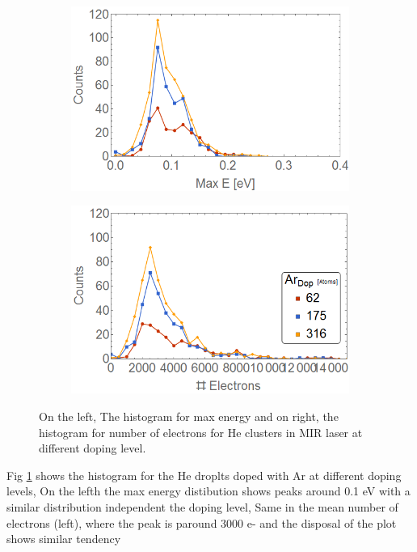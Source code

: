 \begin{figure}[h!]
\centering
\begin{subfigure}[l]{0.49\textwidth}
\includegraphics[width=1\textwidth]{../Images/results/MIR_He_ArDop/Henerg2.png} 
\end{subfigure}
\begin{subfigure}[l]{0.49\textwidth}
\includegraphics[width=1\textwidth]{../Images/results/MIR_He_ArDop/Helec.png}   				\end{subfigure}
\caption[MIR He_Ar. Histograms]{On the left, The histogram for max energy and on right, the histogram for number of electrons for He clusters in MIR laser at different doping level.}
\label{fig:histoArdop}
\end{figure}

Fig \ref{fig:histoArdop} shows the histogram for the He droplts doped with Ar at different doping levels, On the lefth the max energy distibution shows peaks around 0.1 eV with a similar distribution independent the doping level, Same in the mean number of electrons (left), where the peak is paround 3000 e- and the disposal of the plot shows similar tendency

